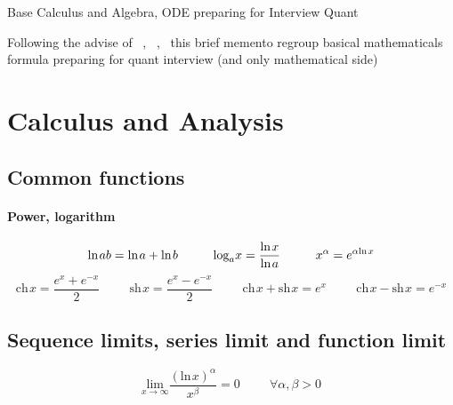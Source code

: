 \documentclass[a4paper,10pt]{article}
\newcommand{\fnc}[2]{%
  \text{#1}\hspace{1pt} #2
}
\begin{document}
\begin{center}Base Calculus and Algebra, ODE preparing for Interview Quant\end{center}
Following the advise of ~\cite{michael2004}, ~\cite{PDGuide},~\cite{advise} this brief memento regroup basical mathematicals formula preparing for quant interview (and only mathematical side)
\section{Calculus and Analysis}
\subsection{Common functions}
\paragraph{Power, logarithm}
\[
\fnc{ln}{ab}=\fnc{ln}{a}+\fnc{ln}{b} \hspace{1cm} \text{log}_{a}x=\frac{\fnc{ln}{x}}{\fnc{ln}{a}} \hspace{1cm} x^{\alpha} = e^{\alpha \fnc{ln}{x}}
\]
\[
\fnc{ch}{x} = \frac{e^x + e^{-x}}{2} \hspace{1cm} \fnc{sh}{x} = \frac{e^x - e^{-x}}{2} \hspace{1cm} \fnc{ch}{x}+\fnc{sh}{x} = e^x \hspace{1cm} \fnc{ch}{x}-\fnc{sh}{x}=e^{-x}
\]
\subsection{Sequence limits, series limit and function limit}
\[
\underset{x\rightarrow \infty}{\text{lim}} \frac{(\fnc{ln}{x})^{\alpha}}{x^{\beta}}=0 \hspace{1cm} \forall \alpha,\beta > 0
\]
\end{document}
